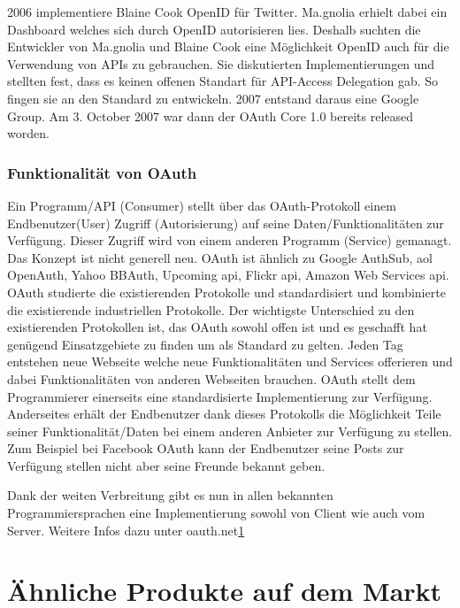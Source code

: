 2006 implementiere Blaine Cook OpenID für Twitter. Ma.gnolia erhielt
dabei ein Dashboard welches sich durch OpenID autorisieren lies. Deshalb
suchten die Entwickler von Ma.gnolia und Blaine Cook eine Möglichkeit
OpenID auch für die Verwendung von APIs zu gebrauchen. Sie diskutierten
Implementierungen und stellten fest, dass es keinen offenen Standart für
API-Access Delegation gab. So fingen sie an den Standard zu entwickeln.
2007 entstand daraus eine Google Group. Am 3. October 2007 war dann der
OAuth Core 1.0 bereits released worden.

\subsubsection{Funktionalität von
OAuth}\label{funktionalituxe4t-von-oauth}

Ein Programm/API (Consumer) stellt über das OAuth-Protokoll einem
Endbenutzer(User) Zugriff (Autorisierung) auf seine
Daten/Funktionalitäten zur Verfügung. Dieser Zugriff wird von einem
anderen Programm (Service) gemanagt. Das Konzept ist nicht generell neu.
OAuth ist ähnlich zu Google AuthSub, aol OpenAuth, Yahoo BBAuth,
Upcoming api, Flickr api, Amazon Web Services api. OAuth studierte die
existierenden Protokolle und standardisiert und kombinierte die
existierende industriellen Protokolle. Der wichtigste Unterschied zu den
existierenden Protokollen ist, das OAuth sowohl offen ist und es
geschafft hat genügend Einsatzgebiete zu finden um als Standard zu
gelten. Jeden Tag entstehen neue Webseite welche neue Funktionalitäten
und Services offerieren und dabei Funktionalitäten von anderen Webseiten
brauchen. OAuth stellt dem Programmierer einerseits eine standardisierte
Implementierung zur Verfügung. Anderseites erhält der Endbenutzer dank
dieses Protokolls die Möglichkeit Teile seiner Funktionalität/Daten bei
einem anderen Anbieter zur Verfügung zu stellen. Zum Beispiel bei
Facebook OAuth kann der Endbenutzer seine Posts zur Verfügung stellen
nicht aber seine Freunde bekannt geben.

Dank der weiten Verbreitung gibt es nun in allen bekannten
Programmiersprachen eine Implementierung sowohl von Client wie auch vom
Server. Weitere Infos dazu unter oauth.net\href{http://oauth.net/2/}{1}

\newpage

\section{Ähnliche Produkte auf dem
Markt}\label{uxe4hnliche-produkte-auf-dem-markt}

